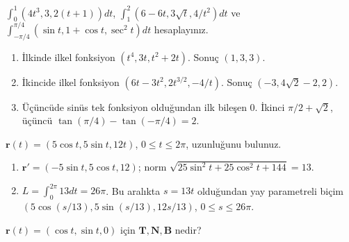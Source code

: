 \begin{tcolorbox}[title={Örnek 3.11 | Dersteki belirli integral üçlüsü},colframe=accent]\(\int_0^1(4t^3,3,2(t+1))dt\), \(\int_1^2(6-6t,3\sqrt t,4/t^2)dt\) ve \(\int_{-\pi/4}^{\pi/4}(\sin t,1+\cos t,\sec^2t)dt\) hesaplayınız.
\par{}\end{tcolorbox}
\begin{tcolorbox}[title={Adım adım çözüm},colback=green!3!white,colframe=green]\begin{enumerate}
\item İlkinde ilkel fonksiyon \((t^4,3t,t^2+2t)\). Sonuç \((1,3,3)\).
\item İkincide ilkel fonksiyon \((6t-3t^2,2t^{3/2},-4/t)\). Sonuç \((-3,4\sqrt2-2,2)\).
\item Üçüncüde sinüs tek fonksiyon olduğundan ilk bileşen 0. İkinci \(\pi/2+\sqrt2\), üçüncü \(\tan(\pi/4)-\tan(-\pi/4)=2\).
\end{enumerate}\end{tcolorbox}
\begin{tcolorbox}[title={Örnek 3.12 | Dersteki 5-12-13 helisi},colframe=accent]\(\mathbf r(t)=(5\cos t,5\sin t,12t)\), \(0\le t\le2\pi\), uzunluğunu bulunuz.
\par{}\end{tcolorbox}
\begin{tcolorbox}[title={Adım adım çözüm},colback=green!3!white,colframe=green]\begin{enumerate}
\item \(\mathbf r\prime=(-5\sin t,5\cos t,12)\); norm \(\sqrt{25\sin^2t+25\cos^2t+144}=13\).
\item \(L=\int_0^{2\pi}13dt=26\pi\). Bu aralıkta \(s=13t\) olduğundan yay parametreli biçim \((5\cos(s/13),5\sin(s/13),12s/13)\), \(0\le s\le26\pi\).
\end{enumerate}\end{tcolorbox}
\begin{tcolorbox}[title={Örnek 3.13 | Çemberin Frenet çatısı},colframe=accent]\(\mathbf r(t)=(\cos t,\sin t,0)\) için \(\mathbf T,\mathbf N,\mathbf B\) nedir?
\par{}\end{tcolorbox}

